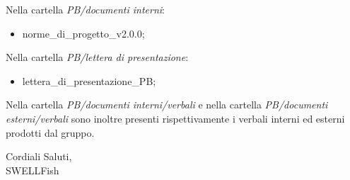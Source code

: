 \documentclass[12pt]{article}
\begin{document}
Nella cartella \textit{PB/documenti interni}:
    \begin{itemize}
    \item norme\_di\_progetto\_v2.0.0;
    \end{itemize}

Nella cartella \textit{PB/lettera di presentazione}:
    \begin{itemize}
    \item lettera\_di\_presentazione\_PB;
    \end{itemize}

Nella cartella \textit{PB/documenti interni/verbali} e nella cartella \textit{PB/documenti
esterni/verbali} sono inoltre presenti rispettivamente i verbali interni ed esterni prodotti dal gruppo. 

\begin{flushright}
Cordiali Saluti,\\
SWELLFish
\end{flushright}
\end{document}
